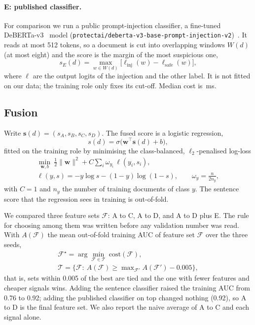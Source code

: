 \paragraph{E: published classifier.}
For comparison we run a public prompt-injection classifier, a fine-tuned
DeBERTa-v3~\cite{he2023debertav3} model
(\texttt{protectai/\allowbreak deberta-v3-base-\allowbreak prompt-injection-v2})~\cite{protectai2024deberta}.
It reads at most 512 tokens, so a document is cut into overlapping windows
$W(d)$ (at most eight) and the score is the margin of the most suspicious one,
\begin{equation}
    s_E(d)=\max_{w\in W(d)}\big[\ell_{\mathrm{inj}}(w)-\ell_{\mathrm{safe}}(w)\big],
    \label{eq:published}
\end{equation}
where $\ell$ are the output logits of the injection and the other label. It is
not fitted on our data; the training role only fixes its cut-off. Median cost
is \resLatMedPub\,ms.

\subsection{Fusion}
Write $\mathbf{s}(d)=(s_A,s_B,s_C,s_D)$. The fused score is a logistic
regression,
\begin{equation}
    s(d)=\sigma\big(\mathbf{w}^{\top}\mathbf{s}(d)+b\big),
    \label{eq:fusion}
\end{equation}
fitted on the training role by minimising the class-balanced, $\ell_2$-penalised
log-loss
\begin{equation}
    \begin{gathered}
    \min_{\mathbf{w},b}\ \tfrac12\|\mathbf{w}\|^{2}+C\sum_{i}\omega_{y_i}\,\ell(y_i,s_i),\\
    \ell(y,s)=-y\log s-(1-y)\log(1-s),\qquad \omega_y=\frac{n}{2n_y},
    \end{gathered}
    \label{eq:lr}
\end{equation}
with $C=1$ and $n_y$ the number of training documents of class $y$. The
sentence score that the regression sees in training is out-of-fold.

We compared three feature sets $\mathcal{F}$: A to C, A to D, and A to D plus E.
The rule for choosing among them was written before any validation number was
read. With $A(\mathcal{F})$ the mean out-of-fold training AUC of feature set
$\mathcal{F}$ over the three seeds,
\begin{equation}
    \begin{gathered}
    \mathcal{F}^{\star}=\arg\min_{\mathcal{F}\in\mathcal{T}}\ \mathrm{cost}(\mathcal{F}),\\
    \mathcal{T}=\big\{\mathcal{F}:\ A(\mathcal{F})\ge\max\nolimits_{\mathcal{F}'}A(\mathcal{F}')-0.005\big\},
    \end{gathered}
    \label{eq:select}
\end{equation}
that is, sets within 0.005 of the best are tied and the one with fewer features
and cheaper signals wins. Adding the sentence classifier raised the training AUC
from 0.76 to 0.92; adding the published classifier on top changed nothing
(0.92), so A to D is the final feature set. We also report the naive average of
A to C and each signal alone.

